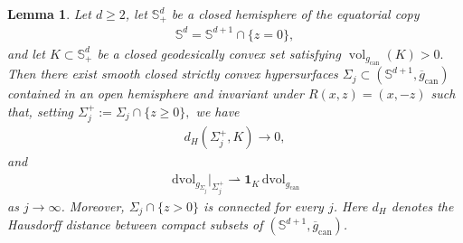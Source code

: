 \documentclass[11pt,reqno]{amsart}
\numberwithin{equation}{section}
\newtheorem{lem}[thm]{Lemma}
\theoremstyle{definition}
\theoremstyle{remark}
\def\bS {\mathbb{S}}
\newcommand{\wto}{\rightharpoonup}
\newcommand{\0}{\emptyset}
\newcommand{\can}{\mathrm{can}}
\newcommand{\vol}{\operatorname{vol}}
\newcommand{\dvol}{\,\mathrm{dvol}}
\begin{document}
\begin{lem}\label{lem:hemisphere-pancake-approximation}
Let $d\geq2$, let $\bS^d_+$ be a closed hemisphere of the equatorial copy
\begin{align}
        \bS^d
        =
        \bS^{d+1}\cap\{z=0\},
\end{align}
and let $K\subset\bS^d_+$ be a closed geodesically convex set satisfying $ \vol_{g_{\can}}(K)>0.$ Then there exist smooth closed strictly convex hypersurfaces $\Sigma_j \subset (\bS^{d+1},\overline g_{\can})$ contained in an open hemisphere and invariant under $R(x,z)=(x,-z)$ such that, setting $ \Sigma_j^+:=\Sigma_j\cap\{z\geq0\},$ we have
\begin{align}\label{eq:hemisphere-pancake-Hausdorff-limit}
        d_H(\Sigma_j^+,K)
        \rightarrow
        0,
\end{align}
and
\begin{align}\label{eq:hemisphere-pancake-measure-limit}
        \dvol_{g_{\Sigma_j}}|_{\Sigma_j^+}
        \wto
        \mathbf{1}_K\dvol_{g_{\can}}
\end{align}
as $j\to \infty$. Moreover, $ \Sigma_j\cap\{z>0\}$ is connected for every $j$. Here $d_H$ denotes the Hausdorff distance between compact subsets of $(\bS^{d+1},\overline g_{\can})$.
\end{lem}
\end{document}
